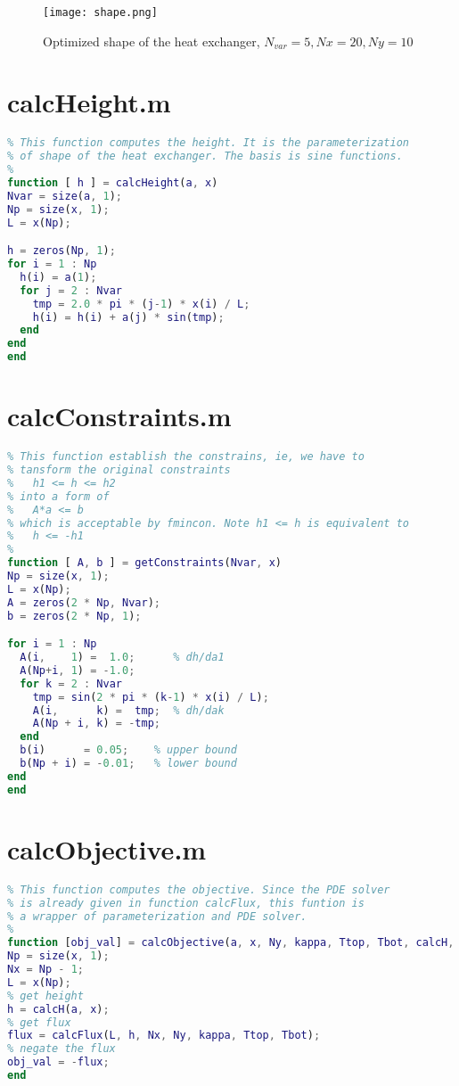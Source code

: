 \documentclass[a4paper]{article}
\begin{document}
\begin{figure}
  \centering
  \texttt{[image: shape.png]}
  \caption{Optimized shape of the heat exchanger, $N_{var}=5, Nx=20, Ny=10$}
  \label{fig:shape}
\end{figure} 

\begin{appendices} 
\section{calcHeight.m}\label{app:calch}
\begin{lstlisting}[language=Matlab]
%
% This function computes the height. It is the parameterization 
% of shape of the heat exchanger. The basis is sine functions.
%
function [ h ] = calcHeight(a, x)
Nvar = size(a, 1);
Np = size(x, 1);
L = x(Np);

h = zeros(Np, 1);
for i = 1 : Np
  h(i) = a(1);
  for j = 2 : Nvar
    tmp = 2.0 * pi * (j-1) * x(i) / L;
    h(i) = h(i) + a(j) * sin(tmp);
  end
end
end
\end{lstlisting}

\section{calcConstraints.m}\label{app:calccons}
\begin{lstlisting}[language=Matlab]
%
% This function establish the constrains, ie, we have to 
% tansform the original constraints
%   h1 <= h <= h2
% into a form of
%   A*a <= b
% which is acceptable by fmincon. Note h1 <= h is equivalent to
%   h <= -h1
%
function [ A, b ] = getConstraints(Nvar, x)
Np = size(x, 1);
L = x(Np);
A = zeros(2 * Np, Nvar);
b = zeros(2 * Np, 1);

for i = 1 : Np
  A(i,    1) =  1.0;      % dh/da1
  A(Np+i, 1) = -1.0;      
  for k = 2 : Nvar
    tmp = sin(2 * pi * (k-1) * x(i) / L);
    A(i,      k) =  tmp;  % dh/dak
    A(Np + i, k) = -tmp;   
  end
  b(i)      = 0.05;    % upper bound
  b(Np + i) = -0.01;   % lower bound
end
end
\end{lstlisting}

\section{calcObjective.m}\label{app:calcobj}
\begin{lstlisting}[language=Matlab]
%
% This function computes the objective. Since the PDE solver
% is already given in function calcFlux, this funtion is
% a wrapper of parameterization and PDE solver.
%
function [obj_val] = calcObjective(a, x, Ny, kappa, Ttop, Tbot, calcH, calcFlux)
Np = size(x, 1);
Nx = Np - 1;
L = x(Np);
% get height
h = calcH(a, x);
% get flux
flux = calcFlux(L, h, Nx, Ny, kappa, Ttop, Tbot);
% negate the flux
obj_val = -flux;
end


\end{lstlisting}
\end{appendices}
\end{document}
